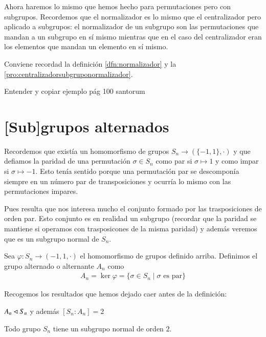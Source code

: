 Ahora haremos lo mismo que hemos hecho para permutaciones pero con subgrupos. Recordemos que el normalizador es lo mismo que el centralizador pero aplicado a subgrupos: el normalizador de un subgrupo son las permutaciones que mandan a un subgrupo en sí mismo mientras que en el caso del centralizador eran los elementos que mandan un elemento en sí mismo.

Conviene recordad la definición \ref{dfn:normalizador} y la \autoref{pro:centralizadorsubgruponormalizador}.

\begin{ej}
	Entender y copiar ejemplo pág 100 santorum
\end{ej}

\section{[Sub]grupos alternados}
\label{sec:gruposalternados}

Recordemos que existía un homomorfismo de grupos $S_n  \to (\{-1, 1\}, \cdot)$ y que defiamos la paridad de una permutación $\sigma \in S_n$ como par si $\sigma \mapsto 1$ y como impar si $\sigma \mapsto -1$. Esto tenía sentido porque una permutación par se descomponía siempre en un número par de transposiciones y ocurría lo mismo con las permutaciones impares.

Pues resulta que nos interesa mucho el conjunto formado por las trasposiciones de orden par. Esto conjunto es en realidad un subgrupo (recordar que la paridad se mantiene si operamos con trasposicones de la misma paridad) y además veremos que es un subgrupo normal de $S_n$.

\begin{dfn}
	Sea $\varphi: S_n \to ({-1, 1}, \cdot)$ el homomorfismo de grupos definido arriba. Definimos el grupo alternado o alternante $A_n$ como
	\begin{align*}
	A_n = \ker \varphi = \{\sigma \in S_n \mid \sigma \text{ es par}\}
	\end{align*}
\end{dfn}

Recogemos los resultados que hemos dejado caer antes de la definición:

\begin{pro}
	$A_n \lhd S_n$ y además $[S_n : A_n] = 2$
\end{pro}

\begin{cor}
	Todo grupo $S_n$ tiene un subgrupo normal de orden $2$.
\end{cor}

